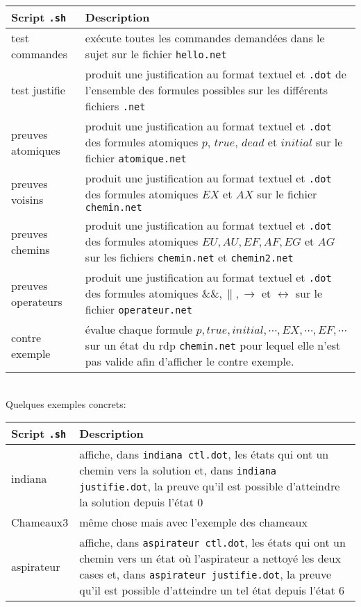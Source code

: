\documentclass[dvipsnames]{report}
\begin{document}
\noindent\begin{tabularx}{\linewidth}{| @{}l | X@{} |}
\hline
Script \texttt{.sh} & Description \\
\hline
test commandes & exécute toutes les commandes demandées dans le sujet sur le fichier \texttt{hello.net} \\
\hline
test justifie & produit une justification au format textuel et \texttt{.dot} de l'ensemble des formules possibles sur les différents fichiers \texttt{.net} \\
\hline
preuves atomiques & produit une justification au format textuel et \texttt{.dot} des formules atomiques $p$, $true$, $dead$ et $initial$ sur le fichier \texttt{atomique.net} \\
\hline
preuves voisins & produit une justification au format textuel et \texttt{.dot} des formules atomiques $EX$ et $AX$ sur le fichier \texttt{chemin.net} \\
\hline
preuves chemins & produit une justification au format textuel et \texttt{.dot} des formules atomiques $EU, AU, EF, AF, EG$ et $AG$ sur les fichiers \texttt{chemin.net} et \texttt{chemin2.net} \\
\hline
preuves operateurs & produit une justification au format textuel et \texttt{.dot} des formules atomiques $\&\&, \|, \rightarrow$ et $\leftrightarrow$ sur le fichier \texttt{operateur.net} \\
\hline
contre exemple & évalue chaque formule  $p, true, initial, \cdots, EX, \cdots, EF, \cdots$ sur un état du rdp \texttt{chemin.net} pour lequel elle n'est pas valide afin d'afficher le contre exemple. \\
\hline
\end{tabularx}

~\\\indent Quelques exemples concrets:\\

\noindent\begin{tabularx}{\linewidth}{| @{}l | X@{} |}
\hline
Script \texttt{.sh} & Description \\
\hline
indiana & affiche, dans \texttt{indiana ctl.dot}, les états qui ont un chemin vers la solution et, dans \texttt{indiana justifie.dot}, la preuve qu'il est possible d'atteindre la solution depuis l'état 0 \\
\hline
Chameaux3 & même chose mais avec l'exemple des chameaux \\
\hline
aspirateur & affiche, dans \texttt{aspirateur ctl.dot}, les états qui ont un chemin vers un état où l'aspirateur a nettoyé les deux cases et, dans \texttt{aspirateur justifie.dot}, la preuve qu'il est possible d'atteindre un tel état depuis l'état 6 \\
\hline
\end{tabularx}
\end{document}

